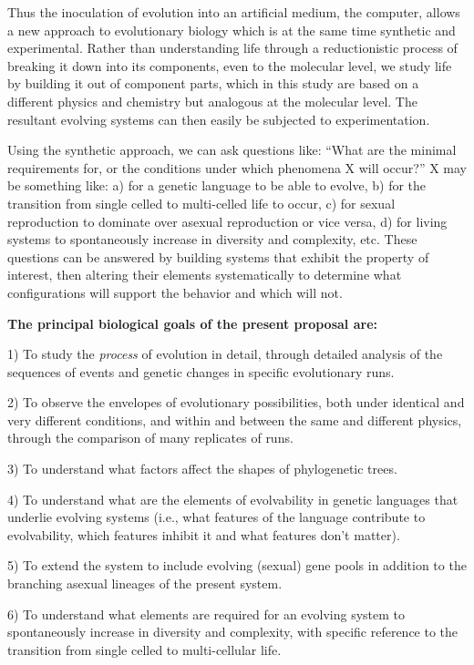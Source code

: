 Thus the inoculation of evolution into an artificial medium, the computer,
allows a new approach to evolutionary biology which is at the same time
synthetic and experimental.  Rather than understanding life through a
reductionistic process of breaking it down into its components, even to the
molecular level, we study life by building it out of component parts, which
in this study are based on a different physics and chemistry but analogous
at the molecular level.  The resultant evolving systems can then easily
be subjected to experimentation.

Using the synthetic approach, we can ask questions like: ``What are the
minimal requirements for, or the conditions under which phenomena X will
occur?''  X may be something like: a) for a genetic language to be able to
evolve, b) for the transition from single celled to multi-celled life to
occur, c) for sexual reproduction to dominate over asexual reproduction or
vice versa, d) for living systems to spontaneously increase in diversity and
complexity, etc.  These questions can be answered by building systems that
exhibit the property of interest, then altering their elements systematically
to determine what configurations will support the behavior and which will not.

\XP
{\bf The principal biological goals of the present proposal are:}

1) To study the {\it process} of evolution in detail, through detailed analysis
of the sequences of events and genetic changes in specific evolutionary runs.

2) To observe the envelopes of evolutionary possibilities, both under identical
and very different conditions, and within and between the same and different
physics, through the comparison of many replicates of runs.

3) To understand what factors affect the shapes of phylogenetic trees.

4) To understand what are the elements of evolvability in genetic languages
that underlie evolving systems (i.e., what features of the language contribute
to evolvability, which features inhibit it and what features don't matter).

5) To extend the system to include evolving (sexual) gene pools in addition
to the branching asexual lineages of the present system.

6) To understand what elements are required for an evolving system to
spontaneously increase in diversity and complexity, with specific reference
to the transition from single celled to multi-cellular life.

